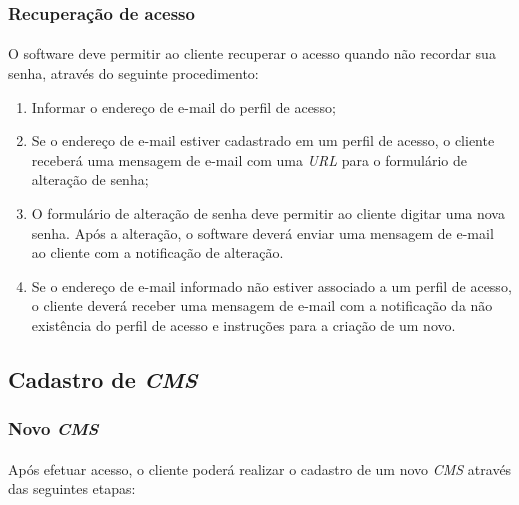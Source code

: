 \documentclass[a4paper,12pt]{article}
\def\blog{\emph{CMS}}
\def\url{\emph{URL}}
\begin{document}
\subsubsection{Recuperação de acesso}

\paragraph{}
O software deve permitir ao cliente recuperar o acesso quando não recordar sua
senha, através do seguinte procedimento:

\begin{enumerate}

\item Informar o endereço de e-mail do perfil de acesso;

\item Se o endereço de e-mail estiver cadastrado em um perfil de acesso, o
cliente receberá uma mensagem de e-mail com uma \url{} para o formulário de
alteração de senha;

\item O formulário de alteração de senha deve permitir ao cliente digitar uma
nova senha. Após a alteração, o software deverá enviar uma mensagem de e-mail
ao cliente com a notificação de alteração.

\item Se o endereço de e-mail informado não estiver associado a um perfil de
acesso, o cliente deverá receber uma mensagem de e-mail com a notificação da
não existência do perfil de acesso e instruções para a criação de um novo.

\end{enumerate}

\subsection{Cadastro de \blog{}}

\subsubsection{Novo \blog{}}

\paragraph{}
Após efetuar acesso, o cliente poderá realizar o cadastro de um novo \blog{}
através das seguintes etapas:
\end{document}
